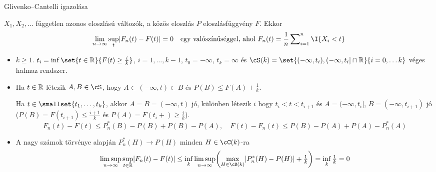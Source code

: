 \documentclass[aspectratio=169,notheorems,9pt,\option]{beamer}
\begin{document}
\begin{frame}{Glivenko--Cantelli igazolása}
  \begin{theorem}
    $X_1,X_2,\dots$ független azonos eloszlású változók, a közös
    eloszlás $P$ eloszlásfüggvény $F$.
    Ekkor
    \begin{displaymath}
      \lim_{n\to\infty}\sup_t \abs*{F_n (t)-F (t)}=0\quad
      \text{egy valószínűséggel, ahol $F_n(t)=\frac1n\sum\nolimits_{i=1}^n \I{X_i<t}$}
    \end{displaymath}
  \end{theorem}
  \begin{itemize}
    \item $k\geq 1$.  $t_i=\inf\set{t\in\real}{F(t)\geq \frac ik}$, $i=1,\dots,k-1$, $t_0=-\infty$, $t_k=\infty$ és
    $\cS(k)=\set{(-\infty,t_i),(-\infty,t_i]\cap\real}{i=0,\dots k}$ véges halmaz rendszer.
    
    \item Ha $t\in\mathbb{R}$ létezik $A,B\in \cS$, hogy $A\subset(-\infty,t)\subset B$ 
    és %
    $P(B)\leq F(A)+\frac1k$. 
    
    Ha $t\in \smallset{t_1,\dots,t_k}$, akkor $A=B=(-\infty,t)$ jó, különben létezik $i$ hogy $t_i<t<t_{i+1}$ és 
    $A=(-\infty,t_i]$, $B=(-\infty,t_{i+1})$ jó ($P(B)=F(t_{i+1})\leq \frac{i+1}k$ és $P(A)=F(t_i+)\geq \frac ik$).
    \pause
    \begin{displaymath}
      F_n(t)-F(t)\leq P_n^*(B)-P(B)+P(B)-P(A),\quad F(t)-F_n(t)\leq P(B)-P(A)+P(A)-P^*_n(A)
    \end{displaymath}

    \item A nagy számok törvénye alapján $P_n^*(H)\to P(H)$ minden $H\in\cC(k)$-ra
    \begin{displaymath}
      \limsup_{n\to\infty} \sup_{t\in\real}\abs{F_n(t)-F(t)}
      \leq \inf_k\limsup_{n\to\infty}\zjel*{\max_{H\in \cS(k)}\abs{P_n^*(H)-P(H)}+\tfrac1k}=\inf_k \tfrac1k=0
    \end{displaymath}
  \end{itemize}  
\end{frame}
\end{document}
